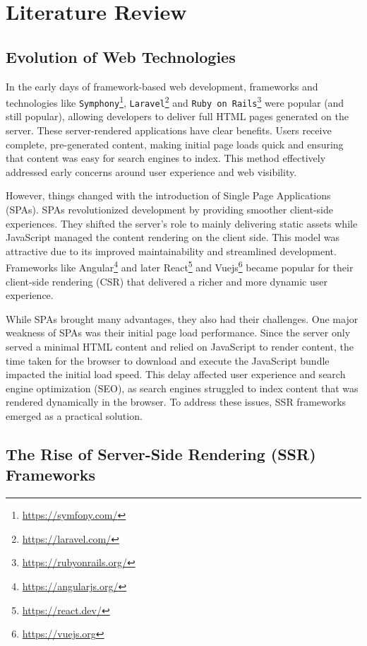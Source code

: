 \section{Literature Review} %

\subsection{Evolution of Web Technologies}

In the early days of framework-based web development, frameworks and technologies like \texttt{Symphony}\footnote{\url{https://symfony.com/}}, \texttt{Laravel}\footnote{\url{https://laravel.com/}} and \texttt{Ruby on Rails}\footnote{\url{https://rubyonrails.org/}} were popular (and still popular), allowing developers to deliver full HTML pages generated on the server. These server-rendered applications have clear benefits. Users receive complete, pre-generated content, making initial page loads quick and ensuring that content was easy for search engines to index. This method effectively addressed early concerns around user experience and web visibility.

However, things changed with the introduction of Single Page Applications (SPAs). SPAs revolutionized development by providing smoother client-side experiences. They shifted the server’s role to mainly delivering static assets while JavaScript managed the content rendering on the client side. This model was attractive due to its improved maintainability and streamlined development. Frameworks like Angular\footnote{\url{https://angularjs.org/}} and later React\footnote{\url{https://react.dev/}} and Vuejs\footnote{\url{https://vuejs.org}} became popular for their client-side rendering (CSR) that delivered a richer and more dynamic user experience.


While SPAs brought many advantages, they also had their challenges. One major weakness of SPAs was their initial page load performance. Since the server only served a minimal HTML content and relied on JavaScript to render content, the time taken for the browser to download and execute the JavaScript bundle impacted the initial load speed. This delay affected user experience and search engine optimization (SEO), as search engines struggled to index content that was rendered dynamically in the browser. To address these issues, SSR frameworks emerged as a practical solution.


\subsection{The Rise of Server-Side Rendering (SSR) Frameworks}

